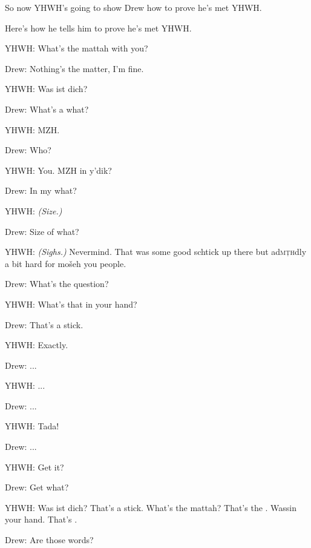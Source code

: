 {
}
{
}
{

	So now YHWH's going to show Drew how to prove
	he's met YHWH.

	Here's how he tells him to prove he's met YHWH.


	YHWH: What's the mattah%
	 with you?

	Drew: Nothing's the matter, I'm fine.

	YHWH: Was ist dich?

	Drew: What's a what?

	YHWH: MZH.

	Drew: Who?
	
	YHWH: You. MZH in y'dik? 

	Drew: In my what?

	YHWH: \textsl{(Size.)}

	Drew: Size of what?

	YHWH: \textsl{(Sighs.)} Nevermind. That was some good schtick up there but ad\textsc{mṭh}dly a bit hard for mošeh you people.

	Drew: What's the question?

	YHWH: What's that in your hand?

	Drew: That's a stick.

	YHWH: Exactly.
	
	Drew: ...
	
	YHWH: ...

	Drew: ...
	
	YHWH: Tada!

	Drew: ...
	
	YHWH: Get it?

	Drew: Get what?
	
	YHWH: Was ist dich? That's a stick. What's the mattah? That's the . Wassin your hand. That's .

	Drew: Are those words?

}

{
}
{
}
{
}

